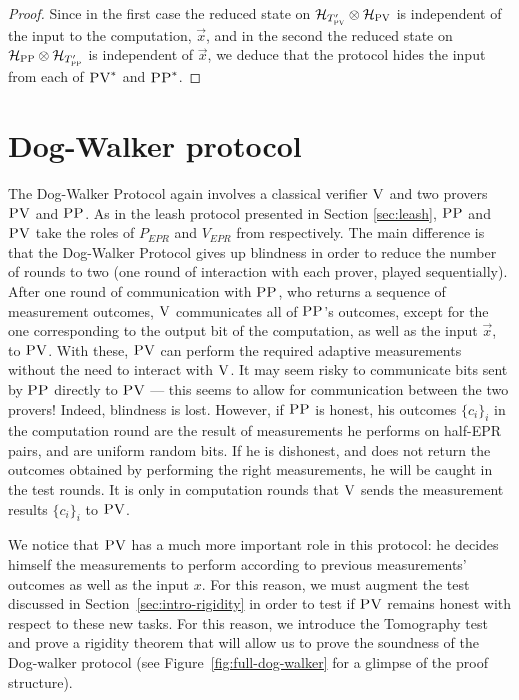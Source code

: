 \documentclass[11pt]{article}
\newcommand{\mH}{\mathcal{H}}
\newcommand{\ver}{\textsc{V}}
\newcommand{\pv}{\textsc{PV}}
\newcommand{\pp}{\textsc{PP}}
\begin{document}
\begin{proof}
Since in the first case the reduced state on $\mH_{T'_{\pv}} \otimes \mH_\pv$ is independent of the input to the computation, $\vec{x}$, and in the second  the reduced state on $ \mH_\pp\otimes \mH_{T'_{\pp}} $ is independent of $\vec{x}$, we deduce that the protocol hides the input from each of $\pv^*$ and $\pp^*$. 
\end{proof}



\section{Dog-Walker protocol}
\label{sec:dog-walker}
The Dog-Walker Protocol again involves a classical verifier $\ver$ and two provers $\pv$ and $\pp$. As in the leash protocol presented in Section \ref{sec:leash}, $\pp$ and $\pv$ take the roles of $P_{EPR}$ and $V_{EPR}$ from \cite{broadbent15howtoverify} respectively. 
The main difference is that the Dog-Walker Protocol gives up blindness in order to reduce the number of rounds to two (one round of interaction with each prover, played sequentially). After 
one
round of communication with $\pp$, who returns a sequence of measurement outcomes, %
$\ver$ communicates all of $\pp$'s outcomes, except for the one corresponding to the output bit of the computation, as well as the input 
$\vec{x}$,
to $\pv$.  
With 
these, $\pv$ can perform the required adaptive measurements without the need to interact with 
$\ver$.
It may seem %
risky to communicate bits sent by $\pp$ directly to $\pv$ --- this seems to allow for communication between the two provers! Indeed, blindness is lost. However, if $\pp$ is honest, his outcomes $\{c_i\}_i$ in the computation round are the result of measurements he performs on half-EPR pairs, and are uniform random bits. If he is dishonest, and does not return the outcomes  obtained by performing the right measurements, he will be caught in the test rounds. It is only in computation rounds that $\ver$ sends the measurement results $\{c_i\}_i$ to $\pv$. 

We notice that $\pv$ has a much more important role in this protocol: he
decides himself the measurements to perform according to previous measurements'
outcomes as well as the input $x$. For this reason, we must augment the test
discussed in Section~\ref{sec:intro-rigidity} in order to test if $\pv$ remains
honest with respect to these new tasks.  For this reason, we introduce the Tomography test and prove a
rigidity theorem that will allow us to prove the soundness of the Dog-walker
protocol
(see Figure~\ref{fig:full-dog-walker} for a glimpse of the proof
structure).
\end{document}
